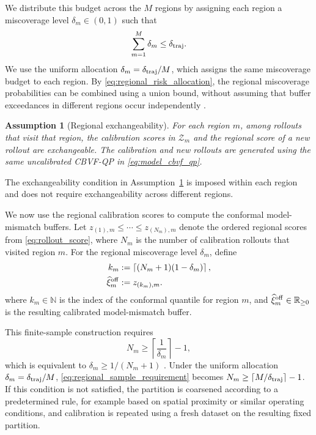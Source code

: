 \documentclass[letterpaper,10pt,conference]{ieeeconf}
\newtheorem{assumption}{Assumption}
\begin{document}
We distribute this budget across the $M$ regions by assigning each region a
miscoverage level $\delta_m\in(0,1)$ such that
\begin{equation}
    \sum_{m=1}^{M}\delta_m\leq\delta_{\rm traj}.
    \label{eq:regional_risk_allocation}
\end{equation}
We use the uniform allocation $\delta_m=\delta_{\rm traj}/M$, which assigns the
same miscoverage budget to each region. By
\eqref{eq:regional_risk_allocation}, the regional miscoverage probabilities can
be combined using a union bound, without assuming that buffer exceedances in
different regions occur independently
\cite{bostrom2021mondrian,dunn1961multiple}.
\begin{assumption}[Regional exchangeability]
\label{ass:offline_regional_exchangeability}
For each region $m$, among rollouts that visit that region, the calibration
scores in $\mathcal Z_m$ and the regional score of a new rollout are
exchangeable. The calibration and new rollouts are generated using the same
uncalibrated CBVF-QP in \eqref{eq:model_cbvf_qp}.
\end{assumption}

The exchangeability condition in
Assumption~\ref{ass:offline_regional_exchangeability} is imposed within each
region and does not require exchangeability across different regions.

We now use the regional calibration scores to compute the conformal
model-mismatch buffers. Let
$z_{(1),m}\leq\cdots\leq z_{(N_m),m}$ denote the ordered regional scores from
\eqref{eq:rollout_score}, where $N_m$ is the number of calibration rollouts
that visited region $m$. For the regional miscoverage level $\delta_m$, define
\begin{subequations}
\begin{align}
    k_m
    &:=
    \left\lceil (N_m+1)(1-\delta_m)\right\rceil,
    \label{eq:offline_mondrian_quantile_index}
    \\
    \widehat\xi^{\rm off}_{m}
    &:=
    z_{(k_m),m}.
    \label{eq:offline_mondrian_buffer}
\end{align}
\end{subequations}
where $k_m\in\mathbb N$ is the index of the conformal quantile for region $m$,
and $\widehat\xi^{\rm off}_{m}\in\mathbb R_{\geq0}$ is the resulting calibrated
model-mismatch buffer.

This finite-sample construction requires
\begin{equation}
    N_m\geq
    \left\lceil\frac{1}{\delta_m}\right\rceil-1,
    \label{eq:regional_sample_requirement}
\end{equation}
which is equivalent to $\delta_m\geq1/(N_m+1)$
\cite{lei2018distributionfree}. Under the uniform allocation
$\delta_m=\delta_{\rm traj}/M$,
\eqref{eq:regional_sample_requirement} becomes
$N_m\geq\lceil M/\delta_{\rm traj}\rceil-1$. If this condition is not satisfied,
the partition is coarsened according to a predetermined rule, for example
based on spatial proximity or similar operating conditions, and calibration is
repeated using a fresh dataset on the resulting fixed partition.
\end{document}
